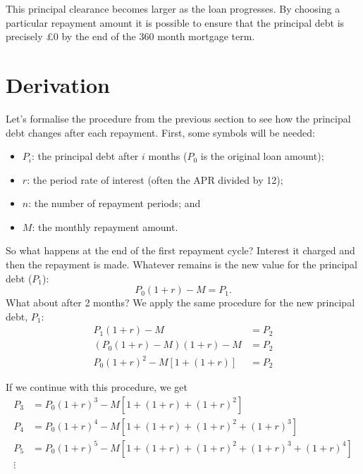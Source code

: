 \documentclass[]{scrartcl}
\theoremstyle{definition}
\begin{document}
This principal clearance becomes larger as the loan progresses. By choosing a particular repayment amount it is possible to ensure that the principal debt is precisely £$0$ by the end of the 360 month mortgage term.

\section{Derivation}\label{sec:derivation}
Let's formalise the procedure from the previous section to see how the principal debt changes after each repayment. First, some symbols will be needed:
\begin{itemize}
    \item $P_i$: the principal debt after $i$ months ($P_0$ is the original loan amount);
    \item $r$: the period rate of interest (often the APR divided by 12);
    \item $n$: the number of repayment periods; and
    \item $M$: the monthly repayment amount.
\end{itemize}

So what happens at the end of the first repayment cycle? Interest it charged and then the repayment is made. Whatever remains is the new value for the principal debt ($P_1$):
\[
    P_0(1 + r) - M = P_1.
\]
What about after 2 months? We apply the same procedure for the new principal debt, $P_1$:
\begin{align*}
    P_1(1 + r) - M &= P_2 \\
    (P_0(1 + r) - M)(1 + r) - M &= P_2 \\
    P_0(1 + r)^2 - M[1 + (1 + r)] &= P_2
\end{align*}

If we continue with this procedure, we get
\begin{align*}
    P_3 &= P_0(1+r)^3 - M[1 + (1+r) + (1+r)^2] \\
    P_4 &= P_0(1+r)^4 - M[1 + (1+r) + (1+r)^2 + (1+r)^3] \\
    P_5 &= P_0(1+r)^5 - M[1 + (1+r) + (1+r)^2 + (1+r)^3 + (1+r)^4] \\
    \vdots
\end{align*}
\end{document}
